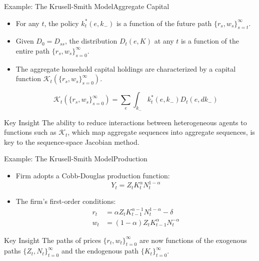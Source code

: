 \documentclass[aspectratio=169]{beamer}
\begin{document}
\begin{frame}{Example: The Krusell-Smith Model}{Aggregate Capital}
    \begin{itemize}
        \item For any $t$, the policy $k^*_t(e, k_-)$ is a function of the future path
              $\{r_s, w_s\}_{s=t}^{\infty}$.
        \item \alert{Given $D_0 = D_{ss}$, the distribution $D_t(e, K)$ at any $t$ is a function of the entire path $\{r_s, w_s\}_{s=0}^{\infty}$.}
        \item The aggregate household capital holdings are characterized by a capital function $\mathcal{K}_t(\{r_s, w_s\}_{s=0}^{\infty})$.

              \[
                  \mathcal{K}_t\left(\{r_s, w_s\}_{s=0}^{\infty}\right) =
                  \sum_{e} \int_{k_-}
                  k^*_t(e, k_-) D_t(e, dk_-)
              \]
    \end{itemize}

    \begin{alertblock}{Key Insight}
        The ability to reduce interactions between heterogeneous agents to functions such as $\mathcal{K}_t$,
        which map aggregate sequences into aggregate sequences, is key to the sequence-space Jacobian method.
    \end{alertblock}
\end{frame}


\begin{frame}{Example: The Krusell-Smith Model}{Production}
    \begin{itemize}
        \item Firm adopts a Cobb-Douglas production function: \[Y_t = Z_t K_t^{\alpha} N_t^{1-\alpha}\]
        \item The firm’s first-order conditions:
              \begin{align*}
                  r_t & = \alpha Z_t K_{t-1}^{\alpha-1} N_t^{1-\alpha} -\delta \\
                  w_t & = (1 - \alpha) Z_t K_{t-1}^{\alpha} N_t^{-\alpha}
              \end{align*}

    \end{itemize}

    \begin{alertblock}{Key Insight}
        The paths of prices $\{r_t, w_t\}_{t=0}^{\infty}$  are now functions of the exogenous paths $\{Z_t,N_t\}_{t=0}^{\infty}$ and the endogenous path $\{K_t\}_{t=0}^{\infty}$.
    \end{alertblock}
\end{frame}
\end{document}
